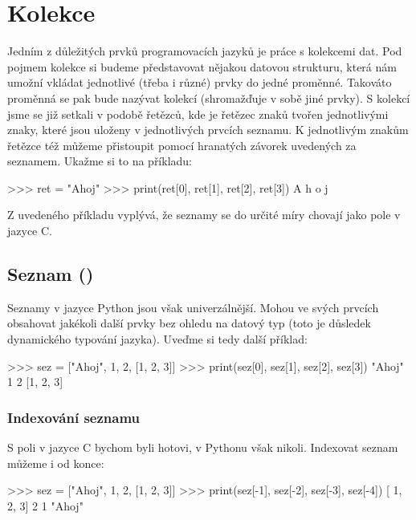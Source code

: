 

\section{Kolekce}
Jedním z důležitých prvků programovacích jazyků je práce s kolekcemi dat. Pod pojmem kolekce si budeme představovat nějakou datovou strukturu, která nám umožní vkládat jednotlivé (třeba i různé) prvky do jedné proměnné. Takováto proměnná se pak bude nazývat kolekcí (shromažďuje v sobě jiné prvky). S kolekcí jsme se již setkali v podobě řetězců, kde je řetězec znaků tvořen jednotlivými znaky, které jsou uloženy v jednotlivých prvcích seznamu. K jednotlivým znakům řetězce též můžeme přistoupit pomocí hranatých závorek uvedených za seznamem. Ukažme si to na příkladu:

\begin{python}
>>> ret = "Ahoj"
>>> print(ret[0], ret[1], ret[2], ret[3])
A h o j
\end{python}

Z uvedeného příkladu vyplývá, že seznamy se do určité míry chovají jako pole v jazyce C.

\subsection{Seznam ()} \label{sec:list}

Seznamy v jazyce Python jsou však univerzálnější. Mohou ve svých prvcích obsahovat jakékoli další prvky bez ohledu na datový typ (toto je důsledek dynamického typování jazyka). Uveďme si tedy další příklad:

\begin{python}
>>> sez = ["Ahoj", 1, 2, [1, 2, 3]]
>>> print(sez[0], sez[1], sez[2], sez[3])
"Ahoj" 1 2 [1, 2, 3]
\end{python}

\subsubsection{Indexování seznamu}
S poli v jazyce C bychom byli hotovi, v Pythonu však nikoli. Indexovat seznam můžeme i od konce:

\begin{python}
>>> sez = ["Ahoj", 1, 2, [1, 2, 3]]
>>> print(sez[-1], sez[-2], sez[-3], sez[-4])
[ 1, 2, 3] 2 1 "Ahoj"
\end{python}

